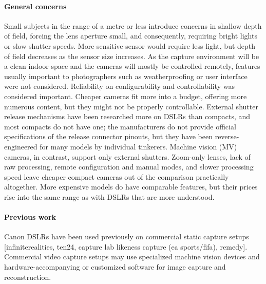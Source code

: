 \paragraph{General concerns}
Small subjects in the range of a metre or less introduce concerns in shallow depth of field, forcing the lens aperture small, and consequently, requiring bright lights or slow shutter speeds.
More sensitive sensor would require less light, but depth of field decreases as the sensor size increases.
As the capture environment will be a clean indoor space and the cameras will mostly be controlled remotely, features usually important to photographers such as weatherproofing or user interface were not considered.
Reliability on configurability and controllability was considered important.
Cheaper cameras fit more into a budget, offering more numerous content, but they might not be properly controllable.
External shutter release mechanisms have been researched more on DSLRs than compacts, and most compacts do not have one;
the manufacturers do not provide official specifications of the release connector pinouts, but they have been reverse-engineered for many models by individual tinkerers.
Machine vision (MV) cameras, in contrast, support only external shutters.
Zoom-only lenses, lack of raw processing, remote configuration and manual modes, and slower processing speed leave cheaper compact cameras out of the comparison practically altogether.
More expensive models do have comparable features, but their prices rise into the same range as with DSLRs that are more understood.

\paragraph{Previous work}
Canon DSLRs have been used previously on commercial static capture setups [infiniterealities, ten24, capture lab likeness capture (ea sports/fifa), remedy].
Commercial video capture setups may use specialized machine vision devices and hardware-accompanying or customized software for image capture and reconstruction.

